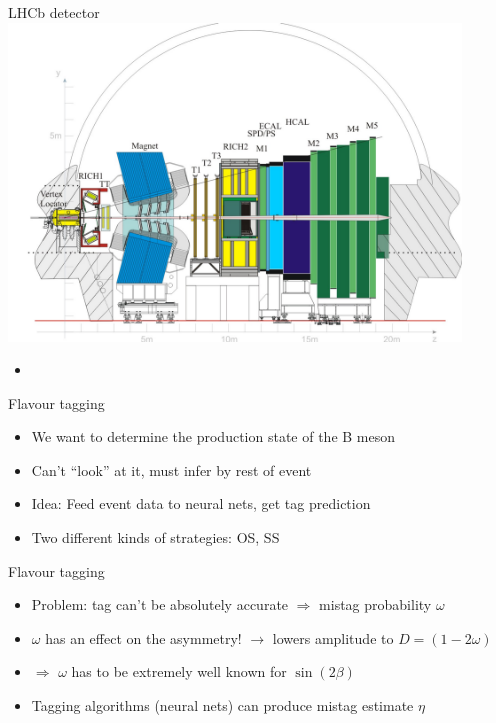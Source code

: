 \begin{frame}{LHCb detector}
  \includegraphics[width=0.9\textwidth]{figures/lhcb.pdf}
  \begin{itemize}
    \item \cite{lhcb}
  \end{itemize}
\end{frame}

\begin{frame}{Flavour tagging}
  \begin{itemize}
  \item \small We want to determine the production state of the B meson
  \item \small Can't \enquote{look} at it, must infer by rest of event
  \item \small Idea: Feed event data to neural nets, get tag prediction
  \item \small Two different kinds of strategies: OS, SS
  \end{itemize}
\end{frame}



\begin{frame}{Flavour tagging}
  \begin{itemize}
  \item Problem: tag can't be absolutely accurate $\Rightarrow$ mistag probability $ω$
  \item $ω$ has an effect on the asymmetry! $\rightarrow$ lowers amplitude to $D = (1 - 2 ω)$
  \item $\Rightarrow$ $ω$ has to be extremely well known for $\sin(2β)$
  \item Tagging algorithms (neural nets) can produce mistag estimate $η$
  \end{itemize}
\end{frame}

